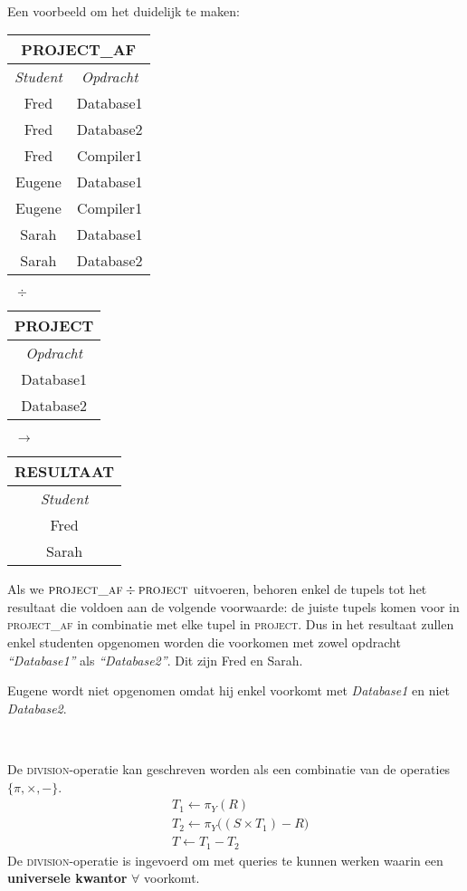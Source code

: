~

\noindent Een voorbeeld om het duidelijk te maken:
\begin{center}
\begin{tabular}{|c|c|}
\hline
\multicolumn{2}{|c|}{\textbf{PROJECT\_AF}} \\
\hline
\textit{Student} & \textit{Opdracht} \\ \hline
Fred & Database1 \\ \hline
Fred & Database2 \\ \hline
Fred & Compiler1 \\ \hline
Eugene & Database1 \\ \hline
Eugene & Compiler1 \\ \hline
Sarah & Database1 \\ \hline
Sarah & Database2 \\
\hline
\end{tabular}
$\;\;\div\;\;$
\begin{tabular}{|c|}
\hline
\multicolumn{1}{|c|}{\textbf{PROJECT}} \\
\hline
\textit{Opdracht} \\ \hline
Database1 \\ \hline
Database2 \\
\hline
\end{tabular}
$\;\;\longrightarrow\;\;$
\begin{tabular}{|c|}
\hline
\multicolumn{1}{|c|}{\textbf{RESULTAAT}} \\
\hline
\textit{Student} \\ \hline
Fred \\ \hline
Sarah \\
\hline
\end{tabular}
\end{center}
Als we $\textsc{project\_af} \div \textsc{project}$ uitvoeren, behoren enkel de tupels tot het resultaat die voldoen aan de volgende voorwaarde: de juiste tupels komen voor in \textsc{project\_af} in combinatie met elke tupel in \textsc{project}. Dus in het resultaat zullen enkel studenten opgenomen worden die voorkomen met zowel opdracht \textit{``Database1''} als \textit{``Database2''}. Dit zijn Fred en Sarah.

Eugene wordt niet opgenomen omdat hij enkel voorkomt met \textit{Database1} en niet \textit{Database2}.

~

\noindent De \textsc{division}-operatie kan geschreven worden als een combinatie van de operaties $\{\pi,\times,-\}$.
\vspace{-2mm}
\begin{align*}
& T_1 \leftarrow \pi_Y (R) \\
& T_2 \leftarrow \pi_Y \big((S \times T_1) - R\big) \\
& T \leftarrow T_1 - T_2
\end{align*}
De \textsc{division}-operatie is ingevoerd om met queries te kunnen werken waarin een \textbf{universele kwantor} $\forall$ voorkomt.


